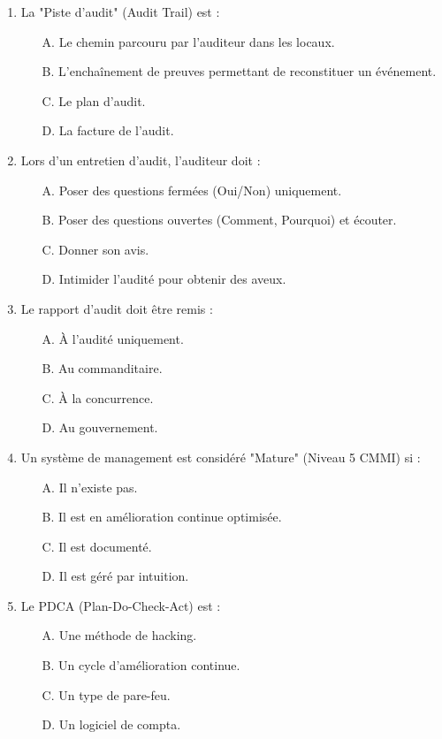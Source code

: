 \begin{enumerate}
    \item La "Piste d'audit" (Audit Trail) est :
    \begin{itemize}
        \item[A.] Le chemin parcouru par l'auditeur dans les locaux.
        \item[B.] L'enchaînement de preuves permettant de reconstituer un événement.
        \item[C.] Le plan d'audit.
        \item[D.] La facture de l'audit.
    \end{itemize}

    \item Lors d'un entretien d'audit, l'auditeur doit :
    \begin{itemize}
        \item[A.] Poser des questions fermées (Oui/Non) uniquement.
        \item[B.] Poser des questions ouvertes (Comment, Pourquoi) et écouter.
        \item[C.] Donner son avis.
        \item[D.] Intimider l'audité pour obtenir des aveux.
    \end{itemize}

    \item Le rapport d'audit doit être remis :
    \begin{itemize}
        \item[A.] À l'audité uniquement.
        \item[B.] Au commanditaire.
        \item[C.] À la concurrence.
        \item[D.] Au gouvernement.
    \end{itemize}

    \item Un système de management est considéré "Mature" (Niveau 5 CMMI) si :
    \begin{itemize}
        \item[A.] Il n'existe pas.
        \item[B.] Il est en amélioration continue optimisée.
        \item[C.] Il est documenté.
        \item[D.] Il est géré par intuition.
    \end{itemize}

    \item Le PDCA (Plan-Do-Check-Act) est :
    \begin{itemize}
        \item[A.] Une méthode de hacking.
        \item[B.] Un cycle d'amélioration continue.
        \item[C.] Un type de pare-feu.
        \item[D.] Un logiciel de compta.
    \end{itemize}


\end{enumerate}
